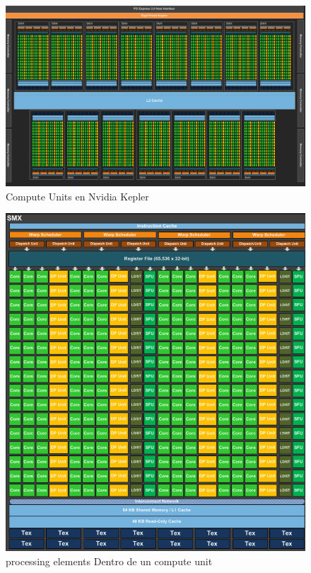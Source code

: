\begin{figure}[h]
    \includegraphics[width=1.0\textwidth]{kepler_1}
    \caption{Compute Units en Nvidia Kepler}
    \label{fig:kepler1}
\end{figure}

\begin{figure}[h]
    \includegraphics[width=1.0\textwidth]{kepler_2}
    \caption{processing elements Dentro de un compute unit}
    \label{fig:kepler2}
\end{figure}

